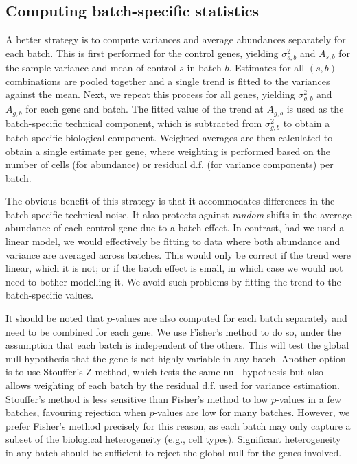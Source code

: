 \documentclass{article}
\begin{document}
\subsection{Computing batch-specific statistics}
A better strategy is to compute variances and average abundances separately for each batch.
This is first performed for the control genes, yielding $\sigma^2_{s,b}$ and $A_{s,b}$ for the sample variance and mean of control $s$ in batch $b$.
Estimates for all $(s, b)$ combinations are pooled together and a single trend is fitted to the variances against the mean.
Next, we repeat this process for all genes, yielding $\sigma^2_{g,b}$ and $A_{g,b}$ for each gene and batch.
The fitted value of the trend at $A_{g,b}$ is used as the batch-specific technical component, which is subtracted from $\sigma^2_{g,b}$ to obtain a batch-specific biological component.
Weighted averages are then calculated to obtain a single estimate per gene, where weighting is performed based on the number of cells (for abundance) or residual d.f. (for variance components) per batch.

The obvious benefit of this strategy is that it accommodates differences in the batch-specific technical noise.
It also protects against \textit{random} shifts in the average abundance of each control gene due to a batch effect.
In contrast, had we used a linear model, we would effectively be fitting to data where both abundance and variance are averaged across batches.
This would only be correct if the trend were linear, which it is not;
or if the batch effect is small, in which case we would not need to bother modelling it.
We avoid such problems by fitting the trend to the batch-specific values.

It should be noted that $p$-values are also computed for each batch separately and need to be combined for each gene.
We use Fisher's method to do so, under the assumption that each batch is independent of the others.
This will test the global null hypothesis that the gene is not highly variable in any batch.
Another option is to use Stouffer's Z method, which tests the same null hypothesis but also allows weighting of each batch by the residual d.f. used for variance estimation.
Stouffer's method is less sensitive than Fisher's method to low $p$-values in a few batches, favouring rejection when $p$-values are low for many batches.
However, we prefer Fisher's method precisely for this reason, as each batch may only capture a subset of the biological heterogeneity (e.g., cell types).
Significant heterogeneity in any batch should be sufficient to reject the global null for the genes involved.
\end{document}

